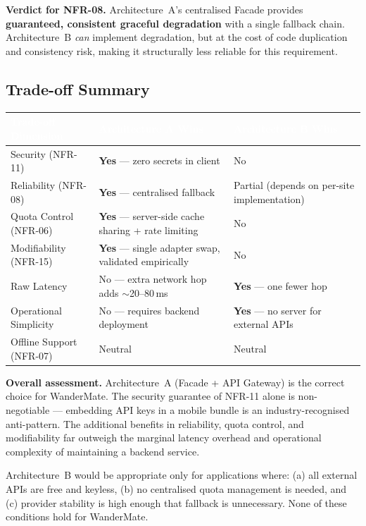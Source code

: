 \documentclass[12pt, a4paper]{article}
\newcommand{\thcell}[1]{\textcolor{white}{\textbf{\small #1}}}
\begin{document}
\begin{tcolorbox}[notebox]
  \textbf{Verdict for NFR-08.} Architecture~A's centralised Facade provides \textbf{guaranteed, consistent graceful degradation} with a single fallback chain. Architecture~B \emph{can} implement degradation, but at the cost of code duplication and consistency risk, making it structurally less reliable for this requirement.
\end{tcolorbox}

\subsection{Trade-off Summary}

\begin{longtable}{L{3.5cm} C{4.5cm} C{4.5cm}}
\toprule
{}
\thcell{Trade-off Dimension} & \thcell{Architecture A Wins} & \thcell{Architecture B Wins} \\
\midrule
\endhead
\bottomrule
\endfoot

Security (NFR-11) & \textbf{Yes} --- zero secrets in client & No \\
Reliability (NFR-08) & \textbf{Yes} --- centralised fallback & Partial (depends on per-site implementation) \\
Quota Control (NFR-06) & \textbf{Yes} --- server-side cache sharing + rate limiting & No \\
Modifiability (NFR-15) & \textbf{Yes} --- single adapter swap, validated empirically & No \\
Raw Latency & No --- extra network hop adds $\sim$20--80\,ms & \textbf{Yes} --- one fewer hop \\
Operational Simplicity & No --- requires backend deployment & \textbf{Yes} --- no server for external APIs \\
Offline Support (NFR-07) & Neutral & Neutral \\
\end{longtable}

\begin{tcolorbox}[notebox]
  \textbf{Overall assessment.} Architecture~A (Facade + API Gateway) is the correct choice for WanderMate. The security guarantee of NFR-11 alone is non-negotiable --- embedding API keys in a mobile bundle is an industry-recognised anti-pattern. The additional benefits in reliability, quota control, and modifiability far outweigh the marginal latency overhead and operational complexity of maintaining a backend service.

  Architecture~B would be appropriate only for applications where: (a) all external APIs are free and keyless, (b) no centralised quota management is needed, and (c) provider stability is high enough that fallback is unnecessary. None of these conditions hold for WanderMate.
\end{tcolorbox}
\end{document}
